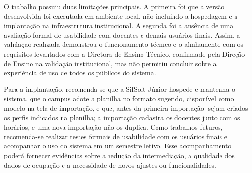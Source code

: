 O trabalho possuiu duas limitações principais. A primeira foi que a versão desenvolvida foi executada em ambiente local, não incluindo a hospedagem e a implantação na infraestrutura institucional. A segunda foi a ausência de uma avaliação formal de usabilidade com docentes e demais usuários finais. Assim, a validação realizada demonstrou o funcionamento técnico e o alinhamento com os requisitos levantados com a Diretora de Ensino Técnico, confirmado pela Direção de Ensino na validação institucional, mas não permitiu concluir sobre a experiência de uso de todos os públicos do sistema.

Para a implantação, recomenda-se que a SifSoft Júnior hospede e mantenha o sistema, que o campus adote a planilha no formato sugerido, disponível como modelo na tela de importação, e que, antes da primeira importação, sejam criados os perfis indicados na planilha; a importação cadastra os docentes junto com os horários, e uma nova importação não os duplica. Como trabalhos futuros, recomenda-se realizar testes formais de usabilidade com os usuários finais e acompanhar o uso do sistema em um semestre letivo. Esse acompanhamento poderá fornecer evidências sobre a redução da intermediação, a qualidade dos dados de ocupação e a necessidade de novos ajustes ou funcionalidades.
